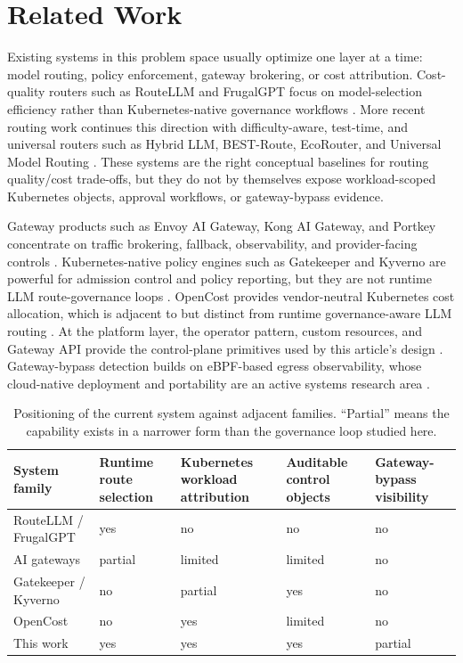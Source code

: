 \section{Related Work}
Existing systems in this problem space usually optimize one layer at a time: model routing, policy enforcement, gateway brokering, or cost attribution. Cost-quality routers such as RouteLLM and FrugalGPT focus on model-selection efficiency rather than Kubernetes-native governance workflows \cite{ding2024routellm,chen2023frugalgpt}. More recent routing work continues this direction with difficulty-aware, test-time, and universal routers such as Hybrid LLM, BEST-Route, EcoRouter, and Universal Model Routing \cite{ding2024hybridllm,go2025bestroute,yang2025ecorouter,jitkrittum2026universalrouting}. These systems are the right conceptual baselines for routing quality/cost trade-offs, but they do not by themselves expose workload-scoped Kubernetes objects, approval workflows, or gateway-bypass evidence.

Gateway products such as Envoy AI Gateway, Kong AI Gateway, and Portkey concentrate on traffic brokering, fallback, observability, and provider-facing controls \cite{envoyAIGatewayDocs,kongAIGateway,portkeyAIGateway}. Kubernetes-native policy engines such as Gatekeeper and Kyverno are powerful for admission control and policy reporting, but they are not runtime LLM route-governance loops \cite{gatekeeperDocs,kyvernoIntro,kyvernoReports}. OpenCost provides vendor-neutral Kubernetes cost allocation, which is adjacent to but distinct from runtime governance-aware LLM routing \cite{opencostOverview,opencostSpec}. At the platform layer, the operator pattern, custom resources, and Gateway API provide the control-plane primitives used by this article's design \cite{kubernetesOperatorPattern,kubernetesCustomResources,kubernetesCRDTask,gatewayAPIDocs}. Gateway-bypass detection builds on eBPF-based egress observability, whose cloud-native deployment and portability are an active systems research area \cite{tetragonOverview,zheng2024wasmbpf}.

\begin{table}[t]
\centering
\small
\begin{tabular}{p{2.4cm} p{2.0cm} p{2.0cm} p{1.7cm} p{2.0cm}}
\toprule
System family & Runtime route selection & Kubernetes workload attribution & Auditable control objects & Gateway-bypass visibility \\
\midrule
RouteLLM / FrugalGPT & yes & no & no & no \\
AI gateways & partial & limited & limited & no \\
Gatekeeper / Kyverno & no & partial & yes & no \\
OpenCost & no & yes & limited & no \\
This work & yes & yes & yes & partial \\
\bottomrule
\end{tabular}
\caption{Positioning of the current system against adjacent families. ``Partial'' means the capability exists in a narrower form than the governance loop studied here.}
\end{table}


